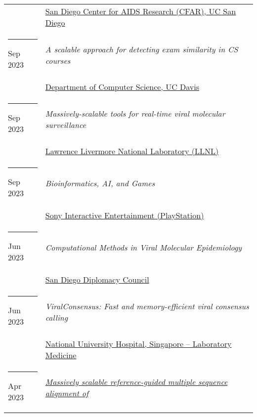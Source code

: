 \documentclass[margin,line]{res}
\begin{document}
\begin{resume}
\begin{longtable}{@{}p{0.7in}p{4in}}
\hspace*{-4mm} & \hspace{4mm} \href{https://cfar.ucsd.edu/}{San Diego Center for AIDS Research (CFAR), UC San Diego}\\
\hspace*{-4mm} \rule{-1mm}{5mm} Sep 2023 & \textit{A scalable approach for detecting exam similarity in CS courses}\\*
\hspace*{-4mm} & \hspace{4mm} \href{https://cs.ucdavis.edu/}{Department of Computer Science, UC Davis}\\
\hspace*{-4mm} \rule{-1mm}{5mm} Sep 2023 & \textit{Massively-scalable tools for real-time viral molecular surveillance}\\*
\hspace*{-4mm} & \hspace{4mm} \href{https://llnl.gov/}{Lawrence Livermore National Laboratory (LLNL)}\\
\hspace*{-4mm} \rule{-1mm}{5mm} Sep 2023 & \textit{Bioinformatics, AI, and Games}\\*
\hspace*{-4mm} & \hspace{4mm} \href{https://sonyinteractive.com/}{Sony Interactive Entertainment (PlayStation)}\\
\hspace*{-4mm} \rule{-1mm}{5mm} Jun 2023 & \textit{Computational Methods in Viral Molecular Epidemiology}\\*
\hspace*{-4mm} & \hspace{4mm} \href{https://sandiegodiplomacy.org/}{San Diego Diplomacy Council}\\
\hspace*{-4mm} \rule{-1mm}{5mm} Jun 2023 & \textit{ViralConsensus: Fast and memory-efficient viral consensus calling}\\*
\hspace*{-4mm} & \hspace{4mm} \href{https://www.nuh.com.sg/our-services/Specialties/Laboratory-Medicine/Pages/default.aspx}{National University Hospital, Singapore -- Laboratory Medicine}\\
\hspace*{-4mm} \rule{-1mm}{5mm} Apr 2023 & \href{https://doi.org/10.7916/kdj9-2t95}{\textit{Massively scalable reference-guided multiple sequence alignment of}}\\*

\end{longtable}
\end{resume}
\end{document}
